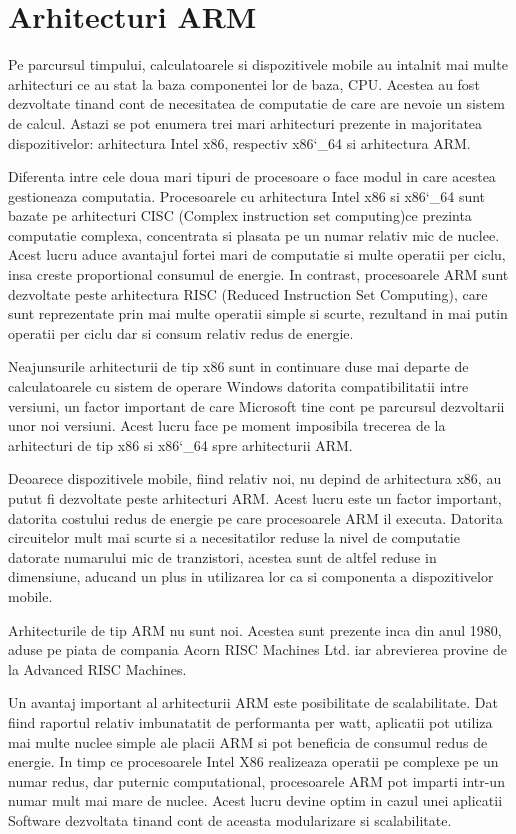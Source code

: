 	\section{Arhitecturi ARM}
	Pe parcursul timpului, calculatoarele si dispozitivele mobile au intalnit mai multe arhitecturi ce au stat la baza componentei lor de baza, CPU. Acestea au fost dezvoltate tinand cont de necesitatea de computatie de care are nevoie un sistem de calcul. Astazi se pot enumera trei mari arhitecturi prezente in majoritatea dispozitivelor: arhitectura Intel x86, respectiv x86\char`_64 si arhitectura ARM. 
	
	Diferenta intre cele doua mari tipuri de procesoare o face modul in care acestea gestioneaza computatia. Procesoarele cu arhitectura Intel x86 si x86\char`_64 sunt bazate pe arhitecturi CISC (Complex instruction set computing)ce prezinta computatie complexa, concentrata si plasata pe un numar relativ mic de nuclee. Acest lucru aduce avantajul fortei mari de computatie si multe operatii per ciclu, insa creste proportional consumul de energie. In contrast, procesoarele ARM sunt dezvoltate peste arhitectura RISC (Reduced Instruction Set Computing), care sunt reprezentate prin mai multe operatii simple si scurte, rezultand in mai putin operatii per ciclu dar si consum relativ redus de energie. 
	
	Neajunsurile arhitecturii de tip x86 sunt in continuare duse mai departe de calculatoarele cu sistem de operare Windows datorita compatibilitatii intre versiuni, un factor important de care Microsoft tine cont pe parcursul dezvoltarii unor noi versiuni. Acest lucru face pe moment imposibila trecerea de la arhitecturi de tip x86 si x86\char`_64 spre arhitecturii ARM. 
	
	Deoarece dispozitivele mobile, fiind relativ noi, nu depind de arhitectura x86, au putut fi dezvoltate peste arhitecturi ARM. Acest lucru este un factor important, datorita costului redus de energie pe care procesoarele ARM il executa. Datorita circuitelor mult mai scurte si a necesitatilor reduse la nivel de computatie datorate numarului mic de tranzistori, acestea sunt de altfel reduse in dimensiune, aducand un plus in utilizarea lor ca si componenta a dispozitivelor mobile.
	
	Arhitecturile de tip ARM nu sunt noi. Acestea sunt prezente inca din anul 1980, aduse pe piata de compania Acorn RISC Machines Ltd. iar abrevierea provine de la Advanced RISC Machines. 
	
	Un avantaj important al arhitecturii ARM este posibilitate de scalabilitate. Dat fiind raportul relativ imbunatatit de performanta per watt, aplicatii pot utiliza mai multe nuclee simple ale placii ARM si pot beneficia de consumul redus de energie. In timp ce procesoarele Intel X86 realizeaza operatii pe complexe pe un numar redus, dar puternic computational, procesoarele ARM pot imparti intr-un numar mult mai mare de nuclee. Acest lucru devine optim in cazul unei aplicatii Software dezvoltata tinand cont de aceasta modularizare si scalabilitate.
	\cite{arm_architecture_android}
	

